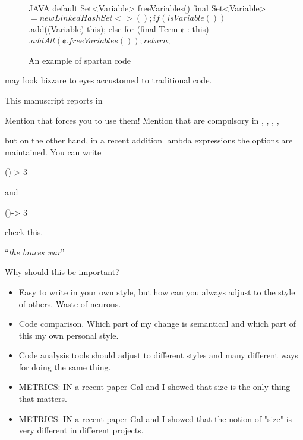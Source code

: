 \begin{figure}[h]
\begin{code}{JAVA}
default Set<Variable> freeVariables() {
    final Set<Variable> $ = new LinkedHashSet<>();
    if (isVariable())
      $.add((Variable) this);
    else
      for (final Term ¢ : this)
        $.addAll(¢.freeVariables());
    return $;
  }
\end{code}
\label{figure:shock-3}
\caption{An example of spartan code}
\end{figure}

  
may look bizzare to eyes accustomed to traditional \Java code.

This manuscript reports in 

Mention that \Go forces you to use them!
Mention that are compulsory in , 
,  
,  
,  

but on the other hand, in a recent addition lambda expressions\cite{lambda}
the options are maintained.
You can write
\begin{JAVA}
()-> 3
\end{JAVA}
and
\begin{JAVA}
  ()-> {3}
\end{JAVA}
check this.

``\emph{the braces war}''


Why should this be important?
\begin{itemize}
    \item Easy to write in  your own style, but how can 
      you always adjust to the style of others.
      Waste of neurons.
    \item Code comparison. Which part of my change is semantical and which 
      part of this my own personal style.
    \item Code analysis tools should adjust to different styles and many
        different ways for doing the same thing.
    \item METRICS: IN a recent paper Gal and I showed that size 
      is the only thing that matters.
    \item METRICS: IN a recent paper Gal and I showed that the notion of 
      "size" is very different in different projects.
\end{itemize}

